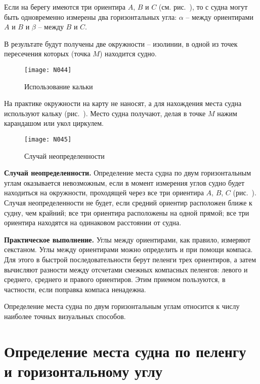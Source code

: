 Если на берегу имеются три ориентира $A$, $B$ и $C$
(см. рис.~), то с судна могут быть одновременно измерены два
горизонтальных угла: $\alpha$ \--- между ориентирами $A$ и $B$ и
$\beta$ \--- между $B$ и $C$.

В результате будут получены две окружности \--- изолинии, в одной из
точек пересечения которых (точка $M$) находится судно.

\begin{figure}[!h]
  \centering{}
  \texttt{[image: N044]}
  \caption{Использование кальки}
  \label{fig:N44}
\end{figure}

На практике окружности на карту не наносят, а для нахождения места
судна используют кальку (рис.~). Место судна получают, делая
в точке $M$ нажим карандашом или укол циркулем.

\begin{figure}
  \centering{}
  \texttt{[image: N045]}
  \caption{Случай неопределенности}
  \label{fig:N45}
\end{figure}

\textbf{Случай неопределенности.} Определение места судна по двум
горизонтальным углам оказывается невозможным, если в момент измерения
углов судно будет находиться на окружности, проходящей через все три
ориентира $A$, $B$, $C$ (рис.~). Случая неопределенности не
будет, если средний ориентир расположен ближе к судну, чем крайний;
все три ориентира расположены на одной прямой; все три ориентира
находятся на одинаковом расстоянии от судна.

\textbf{Практическое выполнение.} Углы между ориентирами, как правило,
измеряют секстаном. Углы между ориентирами можно определить и при
помощи компаса. Для этого в быстрой последовательности берут пеленги
трех ориентиров, а затем вычисляют разности между отсчетами смежных
компасных пеленгов: левого и среднего, среднего и правого
ориентиров. Этим приемом пользуются, в частности, если поправка
компаса ненадежна.

Определение места судна по двум горизонтальным углам относится к числу
наиболее точных визуальных способов.

\section{Определение места судна по пеленгу и горизонтальному углу}

